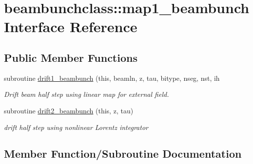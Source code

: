 \hypertarget{interfacebeambunchclass_1_1map1__beambunch}{}\section{beambunchclass\+::map1\+\_\+beambunch Interface Reference}
\label{interfacebeambunchclass_1_1map1__beambunch}
\subsection*{Public Member Functions}
\begin{DoxyCompactItemize}
\item 
subroutine \mbox{\hyperlink{interfacebeambunchclass_1_1map1__beambunch_a769f104462ef136329df136f5f531d27}{drift1\+\_\+beambunch}} (this, beamln, z, tau, bitype, nseg, nst, ih
\begin{DoxyCompactList}\small\item\em Drift beam half step using linear map for external field. \end{DoxyCompactList}\item 
subroutine \mbox{\hyperlink{interfacebeambunchclass_1_1map1__beambunch_a5f0061ebcef646b860c6d44c6f93407c}{drift2\+\_\+beambunch}} (this, z, tau)
\begin{DoxyCompactList}\small\item\em drift half step using nonlinear Lorentz integrator \end{DoxyCompactList}\end{DoxyCompactItemize}


\subsection{Member Function/\+Subroutine Documentation}
\mbox{\label{interfacebeambunchclass_1_1map1__beambunch_a769f104462ef136329df136f5f531d27}} 
